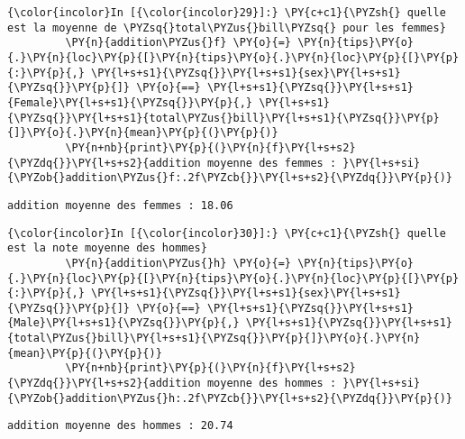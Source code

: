     \begin{Verbatim}[commandchars=\\\{\},frame=single,framerule=0.3mm,rulecolor=\color{cellframecolor}]
{\color{incolor}In [{\color{incolor}29}]:} \PY{c+c1}{\PYZsh{} quelle est la moyenne de \PYZsq{}total\PYZus{}bill\PYZsq{} pour les femmes}
         \PY{n}{addition\PYZus{}f} \PY{o}{=} \PY{n}{tips}\PY{o}{.}\PY{n}{loc}\PY{p}{[}\PY{n}{tips}\PY{o}{.}\PY{n}{loc}\PY{p}{[}\PY{p}{:}\PY{p}{,} \PY{l+s+s1}{\PYZsq{}}\PY{l+s+s1}{sex}\PY{l+s+s1}{\PYZsq{}}\PY{p}{]} \PY{o}{==} \PY{l+s+s1}{\PYZsq{}}\PY{l+s+s1}{Female}\PY{l+s+s1}{\PYZsq{}}\PY{p}{,} \PY{l+s+s1}{\PYZsq{}}\PY{l+s+s1}{total\PYZus{}bill}\PY{l+s+s1}{\PYZsq{}}\PY{p}{]}\PY{o}{.}\PY{n}{mean}\PY{p}{(}\PY{p}{)}
         \PY{n+nb}{print}\PY{p}{(}\PY{n}{f}\PY{l+s+s2}{\PYZdq{}}\PY{l+s+s2}{addition moyenne des femmes : }\PY{l+s+si}{\PYZob{}addition\PYZus{}f:.2f\PYZcb{}}\PY{l+s+s2}{\PYZdq{}}\PY{p}{)}
\end{Verbatim}


    \begin{Verbatim}[commandchars=\\\{\},frame=single,framerule=0.3mm,rulecolor=\color{cellframecolor}]
addition moyenne des femmes : 18.06
\end{Verbatim}

    \begin{Verbatim}[commandchars=\\\{\},frame=single,framerule=0.3mm,rulecolor=\color{cellframecolor}]
{\color{incolor}In [{\color{incolor}30}]:} \PY{c+c1}{\PYZsh{} quelle est la note moyenne des hommes}
         \PY{n}{addition\PYZus{}h} \PY{o}{=} \PY{n}{tips}\PY{o}{.}\PY{n}{loc}\PY{p}{[}\PY{n}{tips}\PY{o}{.}\PY{n}{loc}\PY{p}{[}\PY{p}{:}\PY{p}{,} \PY{l+s+s1}{\PYZsq{}}\PY{l+s+s1}{sex}\PY{l+s+s1}{\PYZsq{}}\PY{p}{]} \PY{o}{==} \PY{l+s+s1}{\PYZsq{}}\PY{l+s+s1}{Male}\PY{l+s+s1}{\PYZsq{}}\PY{p}{,} \PY{l+s+s1}{\PYZsq{}}\PY{l+s+s1}{total\PYZus{}bill}\PY{l+s+s1}{\PYZsq{}}\PY{p}{]}\PY{o}{.}\PY{n}{mean}\PY{p}{(}\PY{p}{)}
         \PY{n+nb}{print}\PY{p}{(}\PY{n}{f}\PY{l+s+s2}{\PYZdq{}}\PY{l+s+s2}{addition moyenne des hommes : }\PY{l+s+si}{\PYZob{}addition\PYZus{}h:.2f\PYZcb{}}\PY{l+s+s2}{\PYZdq{}}\PY{p}{)}
\end{Verbatim}


    \begin{Verbatim}[commandchars=\\\{\},frame=single,framerule=0.3mm,rulecolor=\color{cellframecolor}]
addition moyenne des hommes : 20.74
\end{Verbatim}

